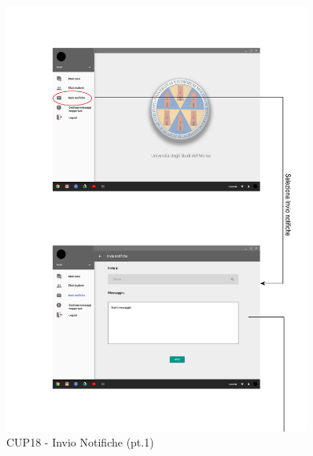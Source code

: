 \begin{figure}
	\centering
	\includegraphics[width=0.9\textwidth]{imgs/gruppo6/activities/act_cup18_invio_notifiche1.pdf}
	\caption{CUP18 - Invio Notifiche (pt.1)}
	\label{fig:act-cup18}
\end{figure}

